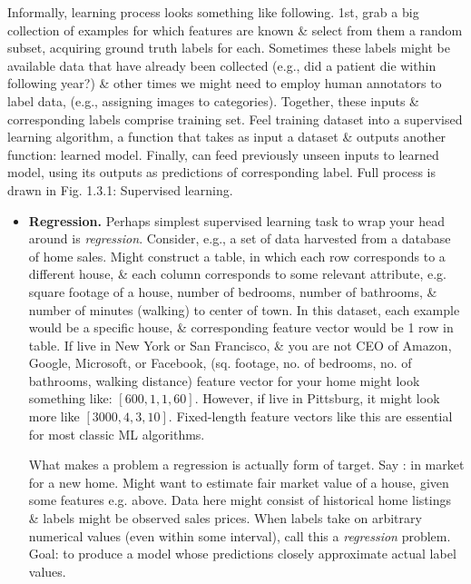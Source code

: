 \documentclass{article}
\begin{document}
\begin{enumerate}
\begin{itemize}
\begin{itemize}
\begin{itemize}
				Informally, learning process looks something like following. 1st, grab a big collection of examples for which features are known \& select from them a random subset, acquiring ground truth labels for each. Sometimes these labels might be available data that have already been collected (e.g., did a patient die within following year?) \& other times we might need to employ human annotators to label data, (e.g., assigning images to categories). Together, these inputs \& corresponding labels comprise training set. Feel training dataset into a supervised learning algorithm, a function that takes as input a dataset \& outputs another function: learned model. Finally, can feed previously unseen inputs to learned model, using its outputs as predictions of corresponding label. Full process is drawn in {\sf Fig. 1.3.1: Supervised learning}.
				\begin{itemize}
					\item {\bf Regression.} Perhaps simplest supervised learning task to wrap your head around is {\it regression}. Consider, e.g., a set of data harvested from a database of home sales. Might construct a table, in which each row corresponds to a different house, \& each column corresponds to some relevant attribute, e.g. square footage of a house, number of bedrooms, number of bathrooms, \& number of minutes (walking) to center of town. In this dataset, each example would be a specific house, \& corresponding feature vector would be 1 row in table. If live in New York or San Francisco, \& you are not CEO of Amazon, Google, Microsoft, or Facebook, (sq. footage, no. of bedrooms, no. of bathrooms, walking distance) feature vector for your home might look something like: $[600,1,1,60]$. However, if live in Pittsburg, it might look more like $[3000,4,3,10]$. Fixed-length feature vectors like this are essential for most classic ML algorithms.
					
					What makes a problem a regression is actually form of target. Say : in market for a new home. Might want to estimate fair market value of a house, given some features e.g. above. Data here might consist of historical home listings \& labels might be observed sales prices. When labels take on arbitrary numerical values (even within some interval), call this a {\it regression} problem. Goal: to produce a model whose predictions closely approximate actual label values.
					

\end{itemize}
\end{itemize}
\end{itemize}
\end{itemize}
\end{enumerate}
\end{document}
